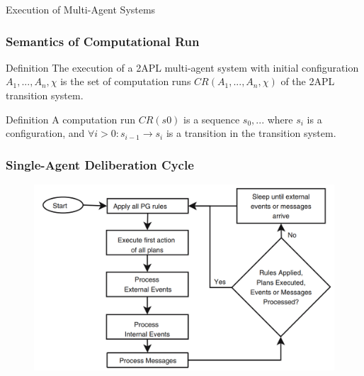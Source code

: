 \documentclass{beamer}
\begin{document}

%


\begin{frame}
\Huge{\centerline{Execution of Multi-Agent Systems}}
\end{frame}


\begin{frame}
\frametitle{Semantics of Computational Run }
\begin{block}{Definition}
	The execution of a 2APL multi-agent system with initial configuration $A_1,...,A_n, \chi$ is the set of computation runs $CR(A_1,...,A_n, \chi)$ of the 2APL transition system.
\end{block}
\begin{block}{Definition}
	A computation run $CR(s0)$ is a sequence $s_0,...$ where $s_i$ is a
configuration, and $ \forall{i>0} : s_{i−1} \rightarrow s_i$ is a transition in the transition system.
\end{block}

\end{frame}



\begin{frame}
	\frametitle{Single-Agent Deliberation Cycle}
    \begin{figure}
      \includegraphics[width=1\textwidth]{deliberation-cycle-individual-2apl}
    \end{figure}
\end{frame}
\end{document}
